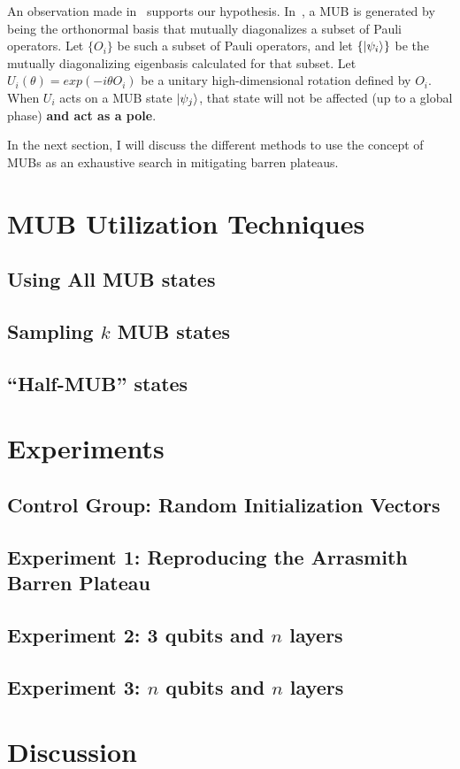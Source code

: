 \documentclass[a4paper,12pt]{article}
\begin{document}
An observation made in~\cite{lawrence_mutually_2002} supports our hypothesis.
In~\cite{lawrence_mutually_2002}, a MUB is generated by being the orthonormal basis that mutually diagonalizes a subset of Pauli operators.
Let $\{O_i\}$ be such a subset of Pauli operators, and let $\{\ket{\psi_i}\}$ be the mutually diagonalizing eigenbasis calculated for that subset.
Let $U_i(\theta) = exp(-i\theta O_i)$ be a unitary high-dimensional rotation defined by $O_i$.
When $U_i$ acts on a MUB state $\ket{\psi_j}$, that state will not be affected (up to a global phase) \textbf{and act as a pole}.

In the next section, I will discuss the different methods to use the concept of MUBs as an exhaustive search in mitigating barren plateaus.

\section{MUB Utilization Techniques}

\subsection{Using All MUB states}

\subsection{Sampling $k$ MUB states}

\subsection{``Half-MUB'' states}


\section{Experiments}

\subsection{Control Group: Random Initialization Vectors}

\subsection{Experiment 1: Reproducing the Arrasmith Barren Plateau}

\subsection{Experiment 2: 3 qubits and $n$ layers}

\subsection{Experiment 3: $n$ qubits and $n$ layers}

\section{Discussion}

\printbibliography
\end{document}
